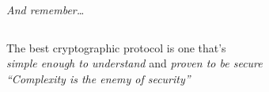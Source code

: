 \documentclass[aspectratio=169, lualatex, handout]{beamer}
\begin{document}
\begin{frame}{\textit{And remember\ldots}}
	\begin{columns}[c]
		\begin{column}{0.5\textwidth}
			\begin{center}
				{\Large The best cryptographic protocol is one that's\\
					\textit{simple enough to understand} and \textit{proven to be secure}} \\
				\vspace{1cm}
				{\small\textit{``Complexity is the enemy of security''}}
			\end{center}
		\end{column}
		\begin{column}{0.5\textwidth}
		\end{column}
	\end{columns}
\end{frame}

\begin{frame}[plain]
	\titlepage
\end{frame}
\end{document}
